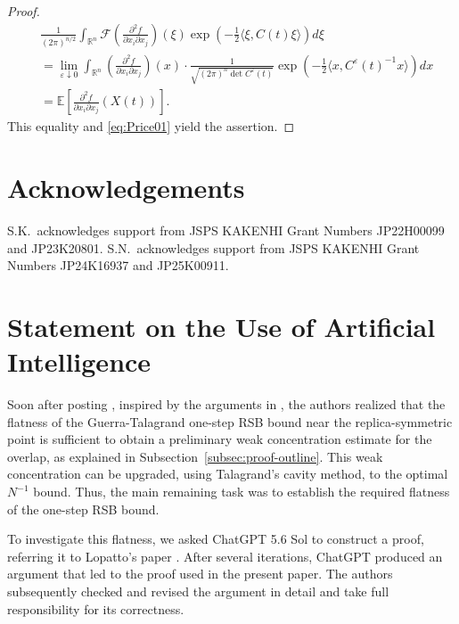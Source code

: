 \documentclass[11pt]{article}
\numberwithin{equation}{section}
\newcommand{\E}{\mathbb{E}}
\newcommand{\1}{\mathbf 1}
\begin{document}
\begin{proof}
\begin{align*}
&\frac{1}{(2\pi )^{n/2}} \int _{{\mathbb R}^n} {\mathcal F} \left( \frac{\partial ^2 f}{\partial x_i \partial x_j} \right)(\xi ) \exp \left( -\frac{1}{2} \langle \xi , C(t)\xi \rangle \right) d\xi \\
%
&= \lim _{\varepsilon \downarrow 0} \int _{{\mathbb R}^n} \left( \frac{\partial ^2 f}{\partial x_i \partial x_j} \right) (x) \cdot \frac{1}{\sqrt{(2\pi)^n \det C^\varepsilon(t)}} \exp \left( -\frac{1}{2}\langle x , C^\varepsilon (t)^{-1} x \rangle \right) dx\\
%
&= \E \left[ \frac{\partial ^2 f}{\partial x_i \partial x_j} (X(t)) \right] .
\end{align*}
This equality and \eqref{eq:Price01} yield the assertion.
\end{proof}

\section*{Acknowledgements}

S.K.\ acknowledges support from JSPS KAKENHI Grant Numbers JP22H00099 and JP23K20801.
S.N.\ acknowledges support from JSPS KAKENHI Grant Numbers JP24K16937 and JP25K00911.

\section*{Statement on the Use of Artificial Intelligence}
Soon after posting \cite{KusuokaNakajima1}, inspired by the arguments in \cite{TalagrandParisi}, the authors realized that the flatness of the Guerra-Talagrand one-step  RSB bound near the replica-symmetric point is sufficient to obtain a preliminary weak concentration estimate for the overlap, as explained in Subsection~\ref{subsec:proof-outline}. This weak concentration can be upgraded, using Talagrand's cavity method, to the optimal $N^{-1}$ bound. Thus, the main remaining task was to establish the required flatness of the one-step RSB bound.

To investigate this flatness,  we asked ChatGPT 5.6 Sol to construct a proof, referring it to Lopatto's paper \cite{Lopatto}. After several iterations, ChatGPT produced an argument that led to the proof used in the present paper. The authors subsequently checked and revised the argument in detail and take full responsibility for its correctness. 
\end{document}
